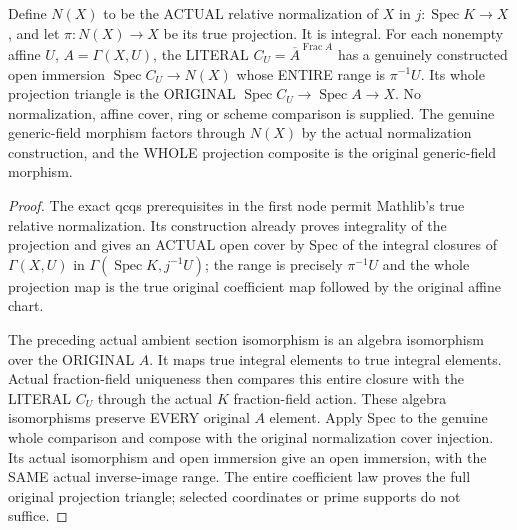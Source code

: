 \begin{theorem}
\label{scheme:actual-integral-normalization-affine-charts}
Define $N(X)$ to be the ACTUAL relative normalization of $X$ in
$j:\operatorname{Spec}K\to X$, and let $\pi:N(X)\to X$ be its
true projection. It is integral. For each nonempty affine $U$,
$A=\Gamma(X,U)$, the LITERAL $C_U=\overline A^{\operatorname{Frac}A}$
has a genuinely constructed open immersion
$\operatorname{Spec}C_U\to N(X)$ whose ENTIRE range is
$\pi^{-1}U$. Its whole projection triangle is the ORIGINAL
$\operatorname{Spec}C_U\to\operatorname{Spec}A\to X$.
No normalization, affine cover, ring or scheme comparison is supplied.
The genuine generic-field morphism factors through $N(X)$ by the actual
normalization construction, and the WHOLE projection composite is the
original generic-field morphism.
\leanok
\end{theorem}
\begin{proof}
The exact qcqs prerequisites in the first node permit Mathlib's
true relative normalization. Its construction already proves
integrality of the projection and gives an ACTUAL open cover by
Spec of the integral closures of $\Gamma(X,U)$ in
$\Gamma(\operatorname{Spec}K,j^{-1}U)$; the range is precisely
$\pi^{-1}U$ and the whole projection map is the true original
coefficient map followed by the original affine chart.

The preceding actual ambient section isomorphism is an algebra
isomorphism over the ORIGINAL $A$. It maps true integral elements
to true integral elements. Actual fraction-field uniqueness then
compares this entire closure with the LITERAL $C_U$ through the
actual $K$ fraction-field action. These algebra isomorphisms
preserve EVERY original $A$ element. Apply Spec to the genuine
whole comparison and compose with the original normalization
cover injection. Its actual isomorphism and open immersion give
an open immersion, with the SAME actual inverse-image range.
The entire coefficient law proves the full original projection
triangle; selected coordinates or prime supports do not suffice.
\end{proof}


